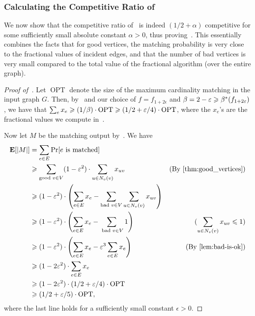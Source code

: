 \subsubsection{Calculating the Competitive Ratio of }\label{sec:competitive}

We now show that the competitive ratio of~ is indeed $(1/2 + \alpha)$ competitive for some sufficiently small absolute constant
$\alpha > 0$, thus proving~. This essentially combines the facts that for good vertices, the matching probability is very close to the fractional values of incident edges, and that the number of bad vertices is very small compared to the total value of the fractional algorithm (over the entire graph).

\begin{proof}[Proof of~]

Let $\operatorname{OPT}$ denote the size of the maximum cardinality matching in the input graph $G$. Then, by~ and our choice of $f=f_{1+2\epsilon}$ and $\beta=2-\varepsilon \geqslant \beta^*(f_{1+2\varepsilon})$, we have that
$\sum_{e} x_{e} \geqslant (1/\beta) \cdot \operatorname{OPT} \geqslant (1/2 + \varepsilon/4) \cdot \operatorname{OPT}$, where the $x_{e}$'s are the fractional values we compute in~.

Now let $M$ be the matching output by~. We have
  \begin{align*}
	\expect[{|M|}] &= \sum_{e \in E} \Pr[e \text{  is matched}] \\
	&\geq \sum_{\text{good } v \in V} (1 - \e^2) \cdot \sum_{u \in N_v(v)} x_{uv} & \text{(By~\Cref{thm:good_vertices})} \\
	&\geq  (1 - \e^2) \cdot \left(\sum_{e \in E} x_e - \sum_{\text{bad } v \in V} \sum_{u \in N_v(v)} x_{uv} \right)
	\\
	&\geq  (1 - \e^2) \cdot \left(\sum_{e \in E} x_e - \sum_{\text{ bad } v \in V} 1 \right) 	& \text{($\sum_{u \in N_v(v)} x_{uv} \leq 1$)} \\	
	&\geq  (1 - \e^2) \cdot \left(\sum_{e \in E} x_e - \e^3 \sum_{e \in E} x_{e} \right) 	& \text{(By~\Cref{lem:bad-is-ok})} \\
	&\geq  (1 - 2\e^2) \cdot \sum_{e \in E} x_{e} \\
	&\geq  (1 - 2\e^2) \cdot (1/2 + \e/4) \cdot \operatorname{OPT} \\
	&\geq  (1/2 + \e/5) \cdot \operatorname{OPT}, 
  \end{align*}
  where the last line holds for a sufficiently small constant $\epsilon>0$.
\end{proof}


